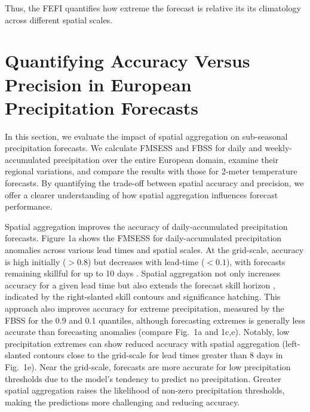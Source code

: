 \documentclass[preprint,12pt,authoryear]{elsarticle}
\begin{document}
Thus, the FEFI quantifies how extreme the forecast is relative its its climatology across different spatial scales. 







\section{Quantifying Accuracy Versus Precision in European Precipitation Forecasts}


In this section, we evaluate the impact of spatial aggregation on sub-seasonal precipitation forecasts. We calculate FMSESS and FBSS for daily and weekly-accumulated precipitation over the entire European domain, examine their regional variations, and compare the results with those for 2-meter temperature forecasts. By quantifying the trade-off between spatial accuracy and precision, we offer a clearer understanding of how spatial aggregation influences forecast performance.


Spatial aggregation improves the accuracy of daily-accumulated precipitation forecasts. Figure 1a shows the FMSESS for daily-accumulated precipitation anomalies across various lead times and spatial scales. At the grid-scale, accuracy is high initially ($> 0.8$) but decreases with lead-time ($< 0.1$), with forecasts remaining skillful for up to 10 days \citep[in agreement with][]{Rivoire2023}. Spatial aggregation not only increases accuracy for a given lead time but also extends the forecast skill horizon \citep[as pointed out by][]{Buizza2015,BuizzLeutbecher2015}, indicated by the right-slanted skill contours and significance hatching. This approach also improves accuracy for extreme precipitation, measured by the FBSS for the 0.9 and 0.1 quantiles, although forecasting extremes is generally less accurate than forecasting anomalies (compare Fig.~1a and 1c,e). Notably, low precipitation extremes can show reduced accuracy with spatial aggregation (left-slanted contours close to the grid-scale for lead times greater than 8 days in Fig.~1e). Near the grid-scale, forecasts are more accurate for low precipitation thresholds due to the model's tendency to predict no precipitation. Greater spatial aggregation raises the likelihood of non-zero precipitation thresholds, making the predictions more challenging and reducing accuracy. 

\end{document}
